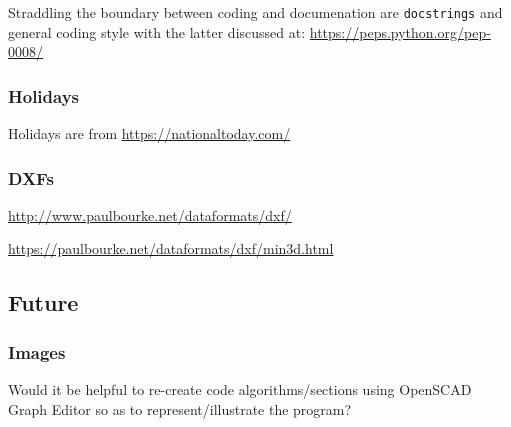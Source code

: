 \documentclass{ltxdoc}
\begin{document}
Straddling the boundary between coding and documenation are \verb|docstrings| and general coding style with the latter discussed at: \url{https://peps.python.org/pep-0008/}


\subsubsection{Holidays}

Holidays are from \url{https://nationaltoday.com/}

\subsubsection{DXFs}

\url{http://www.paulbourke.net/dataformats/dxf/}

\noindent\url{https://paulbourke.net/dataformats/dxf/min3d.html}

\subsection{Future}

\subsubsection{Images}

Would it be helpful to re-create code algorithms/sections using OpenSCAD Graph Editor so as to represent/illustrate the program?

%

%
%
 
\end{document}
